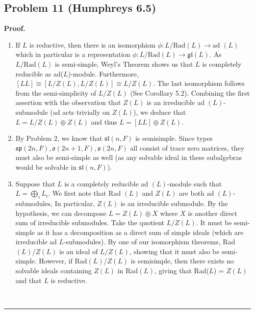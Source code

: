 \documentclass[12pt]{article}%
\newenvironment{proof}[1][Proof]{\textbf{#1.} }{\ \rule{0.5em}{0.5em}}
\begin{document}
\subsection*{Problem 11 (Humphreys 6.5)}
\begin{proof}
  \begin{enumerate}
    \item If $L$ is reductive, then there is an isomorphism $\phi: L / \text{Rad}(L) \rightarrow \text{ad }(L)$ which in particular is a representation $\phi:L / \text{Rad}(L) \rightarrow \mathfrak{gl}(L)$. As $L / \text{Rad}(L)$
    is semi-simple, Weyl's Theorem shows us that $L$ is completely reducible as ad($L$)-module. Furthermore, $[LL] \cong [L/Z(L),L/Z(L)] \cong L/Z(L)$. The last isomorphism follows from the semi-simplicity of $L/Z(L)$ (See Corollary 5.2). Combining the first assertion with the observation that $Z(L)$ is an irreducible ad $(L)$-submodule (ad acts trivially on $Z(L)$), we deduce that $L = L/Z(L) \oplus Z(L)$ and thus $L = [LL] \oplus Z(L)$.

    \item By Problem 2, we know that $\mathfrak{sl}(n,F)$ is semisimple. Since types $\mathfrak{sp}(2n,F),\mathfrak{o}(2n+1,F),\mathfrak{o}(2n,F)$ all consist of trace zero matrices, they must also be semi-simple as well (as any solvable ideal in these subalgebras would be solvable in $\mathfrak{sl}(n,F)$).
    \item Suppose that $L$ is a completely reducible ad $(L)$-module such that $L = \bigoplus_i L_i$. We first note that Rad $(L)$ and $Z(L)$ are both ad $(L)$- submodules, In particular, $Z(L)$ is an irreducible submodule. By the hypothesis, we can decompose $L = Z(L) \oplus X$ where $X$ is another direct sum of irreducible submodules. Take the quotient $L/Z(L)$. It must be semi-simple as it has a decomposition as a direct sum of simple ideals (which are irreducible ad $L$-submodules). By one of our isomorphism theorems, Rad$(L)$/$Z(L)$ is an ideal of $L/Z(L)$, showing that it must also be semi-simple. However, if Rad$(L)$/$Z(L)$ is semisimple, then there exists no solvable ideals containing $Z(L)$ in Rad$(L)$, giving that Rad($L$) = $Z(L)$ and that $L$ is reductive.


\end{enumerate}
\end{proof}
\end{document}
